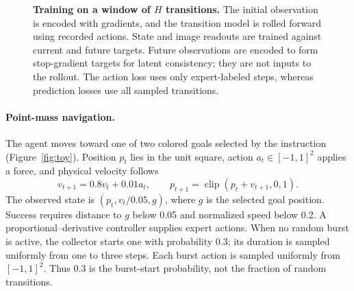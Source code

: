 \documentclass[11pt]{article}
\begin{document}
\begin{figure}[!htbp]
\centering
{}
\caption{\textbf{Training on a window of $H$ transitions.} The initial observation is encoded with gradients, and the transition model is rolled forward using recorded actions. State and image readouts are trained against current and future targets. Future observations are encoded to form stop-gradient targets for latent consistency; they are not inputs to the rollout. The action loss uses only expert-labeled steps, whereas prediction losses use all sampled transitions.}
\label{fig:train}
\end{figure}

\paragraph{Point-mass navigation.} The agent moves toward one of two colored goals selected by the instruction (Figure~\ref{fig:toy}). Position $p_t$ lies in the unit square, action $a_t\in[-1,1]^2$ applies a force, and physical velocity follows
\[
v_{t+1}=0.8v_t+0.01a_t,\qquad
p_{t+1}=\operatorname{clip}(p_t+v_{t+1},0,1).
\]
The observed state is $(p_t,v_t/0.05,g)$, where $g$ is the selected goal position. Success requires distance to $g$ below 0.05 and normalized speed below 0.2. A proportional--derivative controller supplies expert actions. When no random burst is active, the collector starts one with probability 0.3; its duration is sampled uniformly from one to three steps. Each burst action is sampled uniformly from $[-1,1]^2$. Thus 0.3 is the burst-start probability, not the fraction of random transitions.
\end{document}
